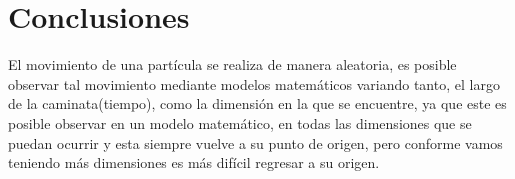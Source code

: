 \documentclass{article}
\begin{document}
\newpage
\section{Conclusiones}\label{con}

El movimiento de una part\'icula se realiza de manera aleatoria, es posible observar tal movimiento mediante modelos matem\'aticos variando tanto, el largo de la caminata(tiempo), como la dimensi\'on en la que se encuentre, ya que este es posible observar en un modelo matem\'atico, en todas las dimensiones que se puedan ocurrir y esta siempre vuelve a su punto de origen, pero conforme vamos teniendo m\'as dimensiones es m\'as dif\'icil regresar a su origen.



\end{document}
